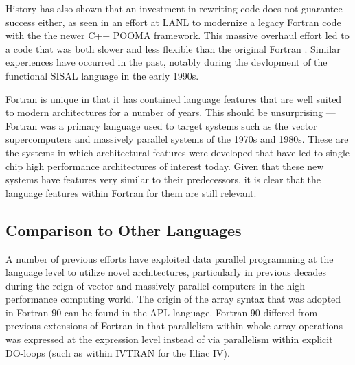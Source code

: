 

History has also shown that an investment in rewriting code does not
guarantee success either, as seen in an effort at LANL to modernize a
legacy Fortran code with the the newer C++ POOMA framework.  This
massive overhaul effort led to a code that was both slower and less
flexible than the original Fortran \cite{basili08hpc}.  Similar
experiences have occurred in the past, notably during the devlopment
of the functional SISAL language in the early 1990s.

Fortran is unique in that it has contained language features that are
well suited to modern architectures for a number of years.  This
should be unsurprising --- Fortran was a primary language used to
target systems such as the vector supercomputers and massively
parallel systems of the 1970s and 1980s.  These are the systems in
which architectural features were developed that have led to single
chip high performance architectures of interest today.  Given that
these new systems have features very similar to their predecessors, it
is clear that the language features within Fortran for them are still
relevant.

\subsection{Comparison to Other Languages}

A number of previous efforts have exploited data parallel programming
at the language level to utilize novel architectures, particularly in
previous decades during the reign of vector and massively parallel
computers in the high performance computing world.  The origin of the
array syntax that was adopted in Fortran 90 can be found in the APL
language\cite{iverson79apl}.  Fortran 90 differed from previous
extensions of Fortran in that parallelism within whole-array
operations was expressed at the expression level instead of via
parallelism within explicit DO-loops (such as within IVTRAN for the
Illiac IV).

